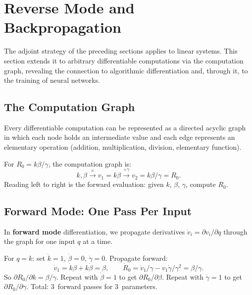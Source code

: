 \section{Reverse Mode and Backpropagation}
\label{sec:reversemodeAD}

The adjoint strategy of the preceding sections applies to
linear systems. This section extends it to arbitrary differentiable
computations via the computation graph, revealing the connection
to algorithmic differentiation and, through it, to the training
of neural networks.

\subsection{The Computation Graph}

Every differentiable computation can be represented as a directed
acyclic graph in which each node holds an intermediate value
and each edge represents an elementary operation (addition,
multiplication, division, elementary function).

For $R_0 = k\beta/\gamma$, the computation graph is:
\begin{equation}
  k, \beta \xrightarrow{\times} v_1 = k\beta
  \xrightarrow{\div\gamma} v_2 = k\beta/\gamma = R_0.
  \label{eq:R0graph}
\end{equation}
Reading left to right is the forward evaluation:
given $k$, $\beta$, $\gamma$, compute $R_0$.

\subsection{Forward Mode: One Pass Per Input}

In \textbf{forward mode} differentiation, we propagate derivatives
$\dot{v}_i = \partial v_i/\partial q$ through the graph
for one input $q$ at a time.

For $q = k$: set $\dot{k} = 1$, $\dot{\beta} = 0$, $\dot{\gamma} = 0$.
Propagate forward:
\[
  \dot{v}_1 = \dot{k}\beta + k\dot{\beta} = \beta,
  \qquad
  \dot{R}_0 = \dot{v}_1/\gamma - v_1\dot{\gamma}/\gamma^2 = \beta/\gamma.
\]
So $\partial R_0/\partial k = \beta/\gamma$.
Repeat with $\dot{\beta} = 1$ to get $\partial R_0/\partial\beta$.
Repeat with $\dot{\gamma} = 1$ to get $\partial R_0/\partial\gamma$.
Total: 3~forward passes for 3~parameters.

